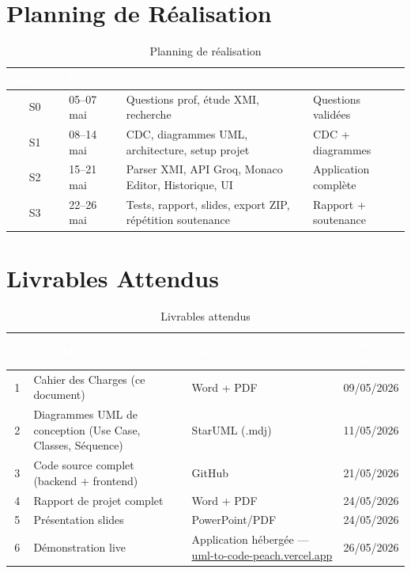 \documentclass[12pt,a4paper]{article}
\begin{document}
\section{Planning de Réalisation}

\begin{table}[H]
\centering
\renewcommand{\arraystretch}{1.3}
\begin{tabularx}{\textwidth}{|c|l|X|X|}
\hline
\rowcolor{darkblue!90}
\textcolor{white}{\textbf{Semaine}} &
\textcolor{white}{\textbf{Période}} &
\textcolor{white}{\textbf{Tâches principales}} &
\textcolor{white}{\textbf{Livrables}} \\
\hline
S0 & 05–07 mai & Questions prof, étude XMI, recherche & Questions validées \\
\hline
\rowcolor{lightgray}
S1 & 08–14 mai & CDC, diagrammes UML, architecture, setup projet & CDC + diagrammes \\
\hline
S2 & 15–21 mai & Parser XMI, API Groq, Monaco Editor, Historique, UI & Application complète \\
\hline
\rowcolor{lightgray}
S3 & 22–26 mai & Tests, rapport, slides, export ZIP, répétition soutenance & Rapport + soutenance \\
\hline
\end{tabularx}
\caption{Planning de réalisation}
\end{table}

\section{Livrables Attendus}

\begin{table}[H]
\centering
\renewcommand{\arraystretch}{1.3}
\begin{tabularx}{\textwidth}{|c|X|l|l|}
\hline
\rowcolor{darkblue!90}
\textcolor{white}{\textbf{\#}} &
\textcolor{white}{\textbf{Livrable}} &
\textcolor{white}{\textbf{Format}} &
\textcolor{white}{\textbf{Date cible}} \\
\hline
1 & Cahier des Charges (ce document) & Word + PDF & 09/05/2026 \\
\hline
\rowcolor{lightgray}
2 & Diagrammes UML de conception (Use Case, Classes, Séquence) & StarUML (.mdj) & 11/05/2026 \\
\hline
3 & Code source complet (backend + frontend) & GitHub & 21/05/2026 \\
\hline
\rowcolor{lightgray}
4 & Rapport de projet complet & Word + PDF & 24/05/2026 \\
\hline
5 & Présentation slides & PowerPoint/PDF & 24/05/2026 \\
\hline
\rowcolor{lightgray}
6 & Démonstration live & Application hébergée — \href{https://uml-to-code-peach.vercel.app}{uml-to-code-peach.vercel.app} & 26/05/2026 \\
\hline
\end{tabularx}
\caption{Livrables attendus}
\end{table}
\end{document}

